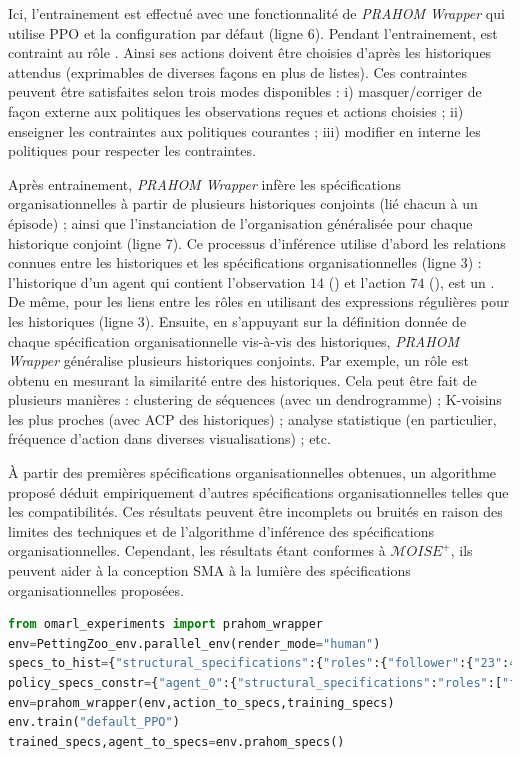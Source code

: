 Ici, l'entrainement est effectué avec une fonctionnalité de \emph{PRAHOM Wrapper} qui utilise PPO et la configuration par défaut (ligne 6).
Pendant l'entrainement,  est contraint au rôle . Ainsi ses actions doivent être choisies d'après les historiques attendus (exprimables de diverses façons en plus de listes). Ces contraintes peuvent être satisfaites selon trois modes disponibles : i) masquer/corriger de façon externe aux politiques les observations reçues et actions choisies  ; ii) enseigner les contraintes aux politiques courantes ; iii) modifier en interne les politiques pour respecter les contraintes.

Après entrainement, \emph{PRAHOM Wrapper} infère les spécifications organisationnelles à partir de plusieurs historiques conjoints (lié chacun à un épisode) ; ainsi que l'instanciation de l'organisation généralisée pour chaque historique conjoint (ligne 7).
Ce processus d'inférence utilise d'abord les relations connues entre les historiques et les spécifications organisationnelles (ligne 3) : l'historique d'un agent qui contient l'observation $14$ () et l'action $74$ (), est un . De même, pour les liens entre les rôles en utilisant des expressions régulières pour les historiques (ligne 3).
%
Ensuite, en s'appuyant sur la définition donnée de chaque spécification organisationnelle vis-à-vis des historiques, \emph{PRAHOM Wrapper} généralise plusieurs historiques conjoints.
%
Par exemple, un rôle est obtenu en mesurant la similarité entre des historiques. Cela peut être fait de plusieurs manières : clustering de séquences (avec un dendrogramme) ; K-voisins les plus proches (avec ACP des historiques) ; analyse statistique (en particulier, fréquence d'action dans diverses visualisations) ; etc.

À partir des premières spécifications organisationnelles obtenues, un algorithme proposé déduit empiriquement d'autres spécifications organisationnelles telles que les compatibilités.
Ces résultats peuvent être incomplets ou bruités en raison des limites des techniques et de l'algorithme d'inférence des spécifications organisationnelles. Cependant, les résultats étant conformes à $\mathcal{M}OISE^+$, ils peuvent aider à la conception SMA à la lumière des spécifications organisationnelles proposées.

\begin{lstlisting}[language=Python, caption={Utilisation basique de \emph{PRAHOM Wrapper}}, label={lst:wrapper_basic_use}]
from omarl_experiments import prahom_wrapper
env=PettingZoo_env.parallel_env(render_mode="human")
specs_to_hist={"structural_specifications":{"roles":{"follower":{"23":41,"14":[74,0]}}...},"functional_specifications":{"links":{"(leader,follower,aut)":".*14.*?89"}...}...}
policy_specs_constr={"agent_0":{"structural_specifications":"roles":["follower"]}}
env=prahom_wrapper(env,action_to_specs,training_specs)
env.train("default_PPO")
trained_specs,agent_to_specs=env.prahom_specs()
\end{lstlisting}

